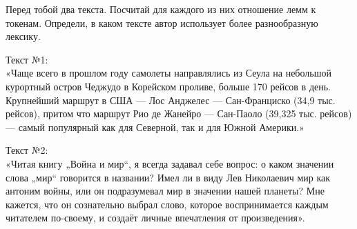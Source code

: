     Перед тобой два текста. Посчитай для каждого из них отношение лемм к токенам. Определи, в каком тексте автор использует более разнообразную лексику.
    
    Текст №1:
    \\
    «Чаще всего в прошлом году самолеты направлялись из Сеула на небольшой курортный остров Чеджудо в Корейском проливе, больше 170 рейсов в день. Крупнейший маршрут в США — Лос Анджелес — Сан-Франциско (34,9 тыс. рейсов), притом что маршрут Рио де Жанейро — Сан-Паоло (39,325 тыс. рейсов) — самый популярный как для Северной, так и для Южной Америки.»

    Текст №2:
    \\
    «Читая книгу „Война и мир“, я всегда задавал себе вопрос: о каком значении слова „мир“ говорится в названии? Имел ли в виду Лев Николаевич мир как антоним войны, или он подразумевал мир в значении нашей планеты? Мне кажется, что он сознательно выбрал слово, которое воспринимается каждым читателем по-своему, и создаёт личные впечатления от произведения».

